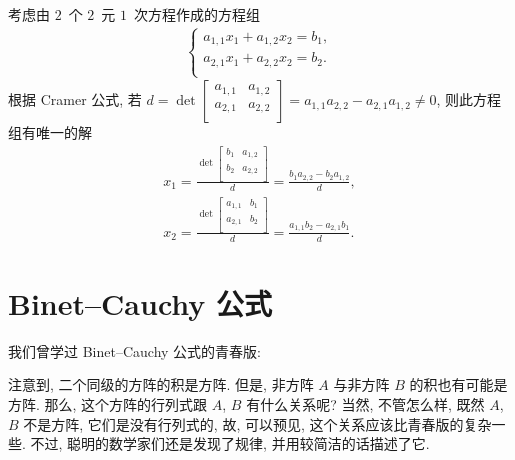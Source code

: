 \documentclass[%
    UTF8,%
    fontset=none,%
    punct=kaiming,%
    zihao=-4,%
    a4paper,%
    oneside,%
]{ctexbook}
\begin{document}
\begin{example}
    考虑由 \(2\)~个 \(2\)~元 \(1\)~次方程作成的方程组
    \begin{align*}
        \begin{cases}
            a_{1,1} x_1 + a_{1,2} x_2 = b_1, \\
            a_{2,1} x_1 + a_{2,2} x_2 = b_2. \\
        \end{cases}
    \end{align*}
    根据 Cramer 公式, 若
    \(d = \det {
        \begin{bmatrix}
            a_{1,1} & a_{1,2} \\
            a_{2,1} & a_{2,2} \\
        \end{bmatrix}
    }
    = a_{1,1} a_{2,2} - a_{2,1} a_{1,2} \neq 0\),
    则此方程组有唯一的解
    \begin{align*}
        x_1
        = \frac{\det {
                \begin{bmatrix}
                    b_{1} & a_{1,2} \\
                    b_{2} & a_{2,2} \\
                \end{bmatrix}
            }}{d}
        = \frac{b_1 a_{2,2} - b_2 a_{1,2}}{d},
        \\
        x_2
        = \frac{\det {
                \begin{bmatrix}
                    a_{1,1} & b_{1} \\
                    a_{2,1} & b_{2} \\
                \end{bmatrix}
            }}{d}
        = \frac{a_{1,1} b_2 - a_{2,1} b_1}{d}.
    \end{align*}
\end{example}

\section{Binet--Cauchy 公式}

\OptionalReading

我们曾学过 Binet--Cauchy 公式的青春版:

\TheoremBinetCauchyLite*

注意到, 二个同级的方阵的积是方阵.
但是, 非方阵 \(A\) 与非方阵 \(B\) 的积也有可能是方阵.
那么, 这个方阵的行列式跟 \(A\), \(B\) 有什么关系呢?
当然, 不管怎么样, 既然 \(A\), \(B\) 不是方阵,
它们是没有行列式的,
故, 可以预见, 这个关系应该比青春版的复杂一些.
不过, 聪明的数学家们还是发现了规律,
并用较简洁的话描述了它.
\end{document}
